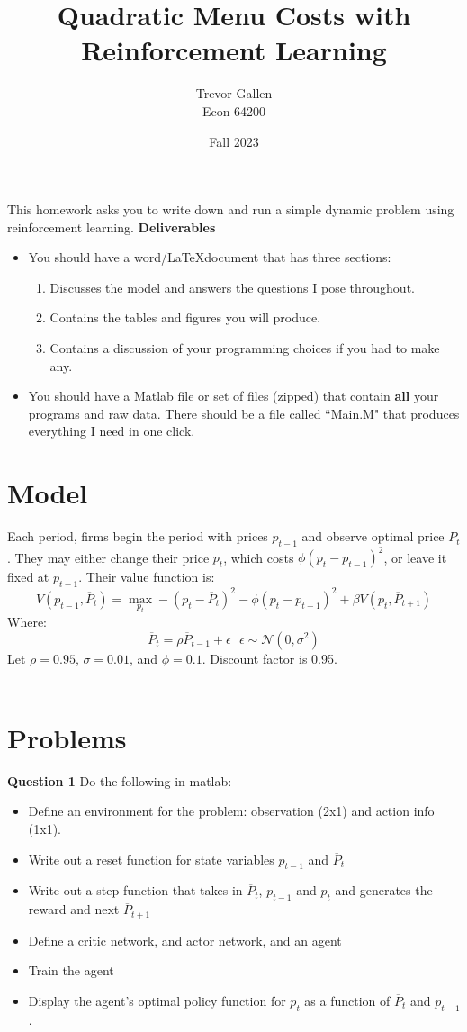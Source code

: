 \documentclass[11pt]{article}
\title{Quadratic Menu Costs with Reinforcement Learning  }
\author{ Trevor Gallen \\ Econ 64200 }
\date{Fall 2023}
\begin{document}


\maketitle

This homework asks you to write down and run a simple dynamic problem using reinforcement learning.
\textbf{Deliverables}
\begin{itemize}
\item You should have a word/\LaTeX document that has three sections: 
\begin{enumerate}
\item Discusses the model and answers the questions I pose throughout.
\item Contains the tables and figures you will produce.
\item Contains a discussion of your programming choices if you had to make any.
\end{enumerate}
\item You should have a Matlab file or set of files (zipped) that contain \textbf{all} your programs and raw data.  There should be a file called ``Main.M" that produces everything I need in one click.
\end{itemize}


\section{Model}
Each period, firms begin the period with prices $p_{t-1}$ and observe optimal price $\overline{P}_t$.  They may either change their price $p_t$, which costs $\phi(p_{t}-p_{t-1})^2$, or leave it fixed at $p_{t-1}$.  Their value function is:
$$V(p_{t-1},\overline{P}_t)=\underset{p_t}{\max} -(p_t-\overline{P}_t)^2-\phi(p_{t}-p_{t-1})^2+\beta V(p_{t},\overline{P}_{t+1})$$
Where:
$$\overline{P}_t=\rho \overline{P}_{t-1}+\epsilon\ \ \ \epsilon\sim\mathcal{N}\left(0,\sigma^2\right)$$
Let $\rho=0.95$, $\sigma=0.01$, and $\phi=0.1$.  Discount factor is 0.95.
\ \\
\ \\

\section{Problems}
\textbf{Question 1} Do the following in matlab:
\begin{itemize}
\item Define an environment for the problem: observation (2x1) and action info (1x1).
\item Write out a reset function for state variables $p_{t-1}$ and $\overline{P}_t$
\item Write out a step function that takes in $\overline{P}_t$, $p_{t-1}$ and $p_{t}$ and generates the reward and next  $\overline{P}_{t+1}$
\item Define a critic network, and actor network, and an agent
\item Train the agent
\item Display the agent's optimal policy function for $p_t$ as a function of $\overline{P}_t$ and $p_{t-1}$.
\end{itemize}
 
\end{document}
